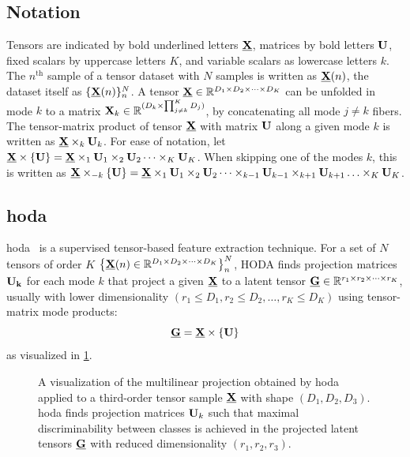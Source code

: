 \documentclass[10pt]{iopart}
\begin{document}
\subsection{Notation}
Tensors are indicated by bold underlined letters $\ten{X}$, matrices by bold
letters $\mat{U}$, fixed scalars by uppercase letters $K$, and variable
scalars as lowercase letters $k$.
The $n^\text{th}$ sample of a tensor dataset with $N$ samples is written as
$\ten{X}(n)$, the dataset itself as $\{\ten{X}(n)\}_n^N$.
A tensor $\ten{X}\in \mathbb{R}^{D_1\times D_2 \times \cdots \times D_K}$ can be
unfolded in mode $k$ to a matrix
$\mat{X}_k\in\mathbb{R}^{(D_k\times\prod_{j\neq k}^K D_j)}$, by concatenating
all mode $j\neq k$ fibers.
The tensor-matrix product of tensor $\ten{X}$ with matrix $\mat{U}$ along a
given mode $k$ is written as $\ten{X}\mpr{\mat{U}}{k}$. For ease of notation, let
$\ten{X}\mmpr{\mat{U}} =
	\ten{X}\mpr{\mat{U}}{1}\mpr{\mat{U}}{2}\cdots\mpr{\mat{U}}{K}$.
When skipping one of the modes $k$, this is
written as $\ten{X}\mmprs{\mat{U}}{k} =
	\ten{X}\mpr{\mat{U}}{1}\mpr{\mat{U}}{2}\cdots\mpr{\mat{U}}{k-1}\mpr{\mat{U}}{k+1}\ldots\mpr{\mat{U}}{K}$.

\subsection{\Acl{hoda}}
\Acl{hoda}~\cite{Phan2010} is a
supervised tensor-based feature extraction technique.
For a set of $N$ tensors of order $K$
$\left\{\ten{X}(n)\in\mathbb{R}^{D_1\times D_2 \times \cdots \times
		D_K}\right\}_n^N$, HODA finds projection matrices $\mat{U_k}$ for each mode $k$
that project a given $\ten{X}$ to a latent tensor
$\ten{G}\in\mathbb{R}^{r_1\times r_2\times\cdots\times r_K}$, usually with lower
dimensionality $(r_1\leq D_1,r_2\leq D_2,\ldots,r_K\leq D_K)$ using
tensor-matrix mode products:
\begin{equation}
	\ten{G}  = \ten{X}\mmpr{\mat{U}}
	\label{eq:HODA-backward}
\end{equation}
as visualized in \cref{fig:HODA-backward}.
\begin{figure}[t]
  \centering
	
  \caption[A \acs{hoda} backward projection.]{%
    A visualization of the multilinear projection obtained by \acf{hoda} applied to a third-order tensor
    sample $\ten{X}$ with shape $(D_1,D_2, D_3)$.
		\Ac{hoda} finds projection matrices $\mat{U}_k$ such that maximal
		discriminability between classes is achieved in the projected latent tensors
		$\ten{G}$ with reduced dimensionality $(r_1,r_2,r_3)$.}
	\label{fig:HODA-backward}
\end{figure}
\end{document}
